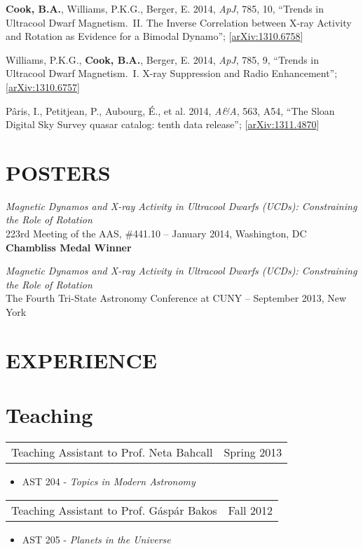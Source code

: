 \documentclass[margin]{res}
\begin{document}
\begin{resume}
\textbf{Cook, B.A.}, Williams, P.K.G., Berger, E. 2014, \textit{ApJ},
785, 10, ``Trends in Ultracool Dwarf Magnetism.~II. The Inverse
Correlation between X-ray Activity and Rotation as Evidence for a
Bimodal Dynamo'';
[\href{http://arxiv.org/abs/1310.6758}{arXiv:1310.6758}]

Williams, P.K.G., \textbf{Cook, B.A.}, Berger, E. 2014, \textit{ApJ},
785, 9, ``Trends in Ultracool Dwarf Magnetism.~I. X-ray Suppression
and Radio Enhancement'';
[\href{http://arxiv.org/abs/1310.6757}{arXiv:1310.6757}]

P\^{a}ris, I., Petitjean, P., Aubourg, \'E., et al. 2014,
\textit{A\&A}, 563, A54, ``The Sloan Digital Sky Survey quasar
catalog: tenth data release''; [\href{http://arxiv.org/abs/1311.4870}{arXiv:1311.4870}]

\section{POSTERS}

\textit{Magnetic Dynamos and X-ray Activity in Ultracool Dwarfs (UCDs):
Constraining the Role of Rotation}\\ 223rd Meeting of the AAS,
\#441.10 -- January 2014, Washington, DC \\ \textbf{Chambliss Medal
  Winner}

\textit{Magnetic Dynamos and X-ray Activity in Ultracool Dwarfs
  (UCDs): Constraining the Role of Rotation}\\ The Fourth Tri-State
Astronomy Conference at CUNY -- September 2013, New York

\section{EXPERIENCE}      
\normalsize{\section{Teaching}}
\begin{tabular}{@{}p{4in} r}
  Teaching Assistant to Prof. Neta Bahcall & Spring 2013
\end{tabular}
\begin{itemize}
\item[] AST 204 - \textit{Topics in Modern Astronomy}
\end{itemize}

\begin{tabular}{@{}p{4in} r}
  Teaching Assistant to Prof. G\'asp\'ar Bakos & Fall 2012
\end{tabular}
\begin{itemize}
\item[] AST 205 - \textit{Planets in the Universe}
\end{itemize}


\end{resume}
\end{document}
